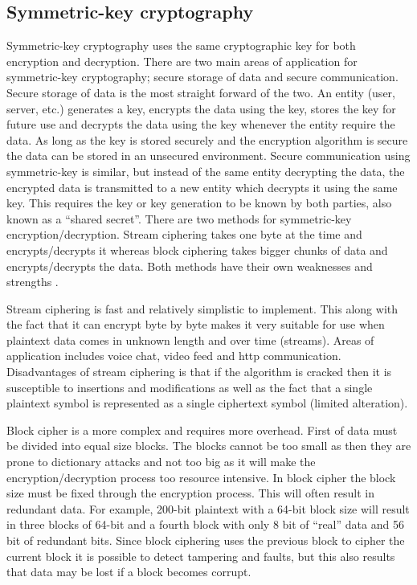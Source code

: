 \subsection{Symmetric-key cryptography}
Symmetric-key cryptography uses the same cryptographic key for both encryption and decryption. There are two main areas of application for symmetric-key cryptography; secure storage of data and secure communication. Secure storage of data is the most straight forward of the two. An entity (user, server, etc.) generates a key, encrypts the data using the key, stores the key for future use and decrypts the data using the key whenever the entity require the data. As long as the key is stored securely and the encryption algorithm is secure the data can be stored in an unsecured environment. Secure communication using symmetric-key is similar, but instead of the same entity decrypting the data, the encrypted data is transmitted to a new entity which decrypts it using the same key. This requires the key or key generation to be known by both parties, also known as a ``shared secret''. There are two methods for symmetric-key encryption/decryption. Stream ciphering takes one byte at the time and encrypts/decrypts it whereas block ciphering takes bigger chunks of data and encrypts/decrypts the data. Both methods have their own weaknesses and strengths \cite[~Ch. 2.1.1]{cryptoMath}.

Stream ciphering is fast and relatively simplistic to implement. This along with the fact that it can encrypt byte by byte makes it very suitable for use when plaintext data comes in  unknown length and over time (streams). Areas of application includes voice chat, video feed and http communication. Disadvantages of stream ciphering is that if the algorithm is cracked then it is susceptible to insertions and modifications as well as the fact that a single plaintext symbol is represented as a single ciphertext symbol (limited alteration).

Block cipher is a more complex and requires more overhead. First of data must be divided into equal size blocks. The blocks cannot be too small as then they are prone to dictionary attacks and not too big as it will make the encryption/decryption process too resource intensive. In block cipher the block size must be fixed through the encryption process. This will often result in redundant data. For example, 200-bit plaintext with a 64-bit block size will result in three blocks of 64-bit and a fourth block with only 8 bit of ``real'' data and 56 bit of redundant bits. Since block ciphering uses the previous block to cipher the current block it is possible to detect tampering and faults, but this also results that data may be lost if a block becomes corrupt.


